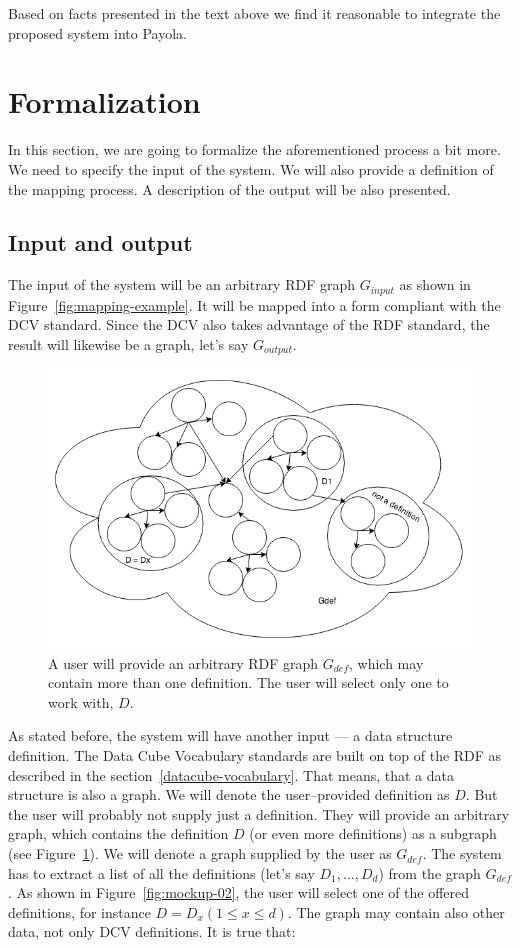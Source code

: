 Based on facts presented in the text above we find it reasonable to integrate 
the proposed system into Payola.

\section{Formalization}

In this section, we are going to formalize the aforementioned process a bit 
more. We need to specify the input of the system. We will also 
provide a definition of the mapping process. A description of the output will be 
also presented.

\subsection{Input and output}

The input of the system will be an arbitrary RDF graph $G_{input}$ as shown
in Figure~\ref{fig:mapping-example}. It will be mapped into a form compliant
with the DCV standard. Since the DCV also takes advantage of the RDF standard,
the result will likewise be a graph, let's say $G_{output}$.

\begin{figure}
	\centering
	\includegraphics[width=120mm]{img/definition-in-graph.png}
	\caption{A user will provide an arbitrary RDF graph $G_{def}$, which may contain more than one definition. The user will select only one to work with, $D$.}
	\label{fig:definition-in-graph}
\end{figure}

As stated before, the system will have another input --- a data structure 
definition. The Data Cube Vocabulary standards are built on top of the RDF as described in the 
section~\ref{datacube-vocabulary}. That means, that a data structure is also a 
graph. We will denote the user--provided definition as $D$. But the user will probably not 
supply just a definition. They will provide an arbitrary graph, which contains the definition $D$ 
(or even more definitions) as a subgraph (see Figure~\ref{fig:definition-in-graph}).
We will denote a graph
supplied by the user as $G_{def}$. The system has to extract a list of all the definitions
(let's say $D_1, ..., D_d$) from the graph $G_{def}$. As shown in Figure~\ref{fig:mockup-02},
the user will select one of the offered definitions, for instance $D = D_x (1 \leq x \leq d)$.
The graph may contain also other data, not only DCV definitions. It is true 
that:\\

